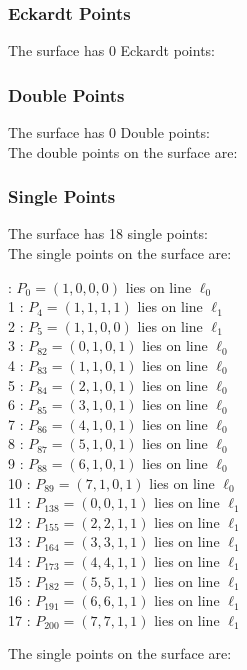 \documentclass{article}
\begin{document}
{\subsubsection*{Eckardt Points}
The surface has 0 Eckardt points:\\
\subsubsection*{Double Points}
The surface has 0 Double points:\\
The double points on the surface are:\\
\begin{multicols}{2}
\noindent
\end{multicols}
\subsubsection*{Single Points}
The surface has 18 single points:\\
The single points on the surface are:\\
\begin{multicols}{2}
 : $P_{0}=( 1, 0, 0, 0 )$ lies on line $\ell_{0}$\\
1 : $P_{4}=( 1, 1, 1, 1 )$ lies on line $\ell_{1}$\\
2 : $P_{5}=( 1, 1, 0, 0 )$ lies on line $\ell_{1}$\\
3 : $P_{82}=( 0, 1, 0, 1 )$ lies on line $\ell_{0}$\\
4 : $P_{83}=( 1, 1, 0, 1 )$ lies on line $\ell_{0}$\\
5 : $P_{84}=( 2, 1, 0, 1 )$ lies on line $\ell_{0}$\\
6 : $P_{85}=( 3, 1, 0, 1 )$ lies on line $\ell_{0}$\\
7 : $P_{86}=( 4, 1, 0, 1 )$ lies on line $\ell_{0}$\\
8 : $P_{87}=( 5, 1, 0, 1 )$ lies on line $\ell_{0}$\\
9 : $P_{88}=( 6, 1, 0, 1 )$ lies on line $\ell_{0}$\\
10 : $P_{89}=( 7, 1, 0, 1 )$ lies on line $\ell_{0}$\\
11 : $P_{138}=( 0, 0, 1, 1 )$ lies on line $\ell_{1}$\\
12 : $P_{155}=( 2, 2, 1, 1 )$ lies on line $\ell_{1}$\\
13 : $P_{164}=( 3, 3, 1, 1 )$ lies on line $\ell_{1}$\\
14 : $P_{173}=( 4, 4, 1, 1 )$ lies on line $\ell_{1}$\\
15 : $P_{182}=( 5, 5, 1, 1 )$ lies on line $\ell_{1}$\\
16 : $P_{191}=( 6, 6, 1, 1 )$ lies on line $\ell_{1}$\\
17 : $P_{200}=( 7, 7, 1, 1 )$ lies on line $\ell_{1}$\\
\end{multicols}
The single points on the surface are:\\
}
\end{document}
